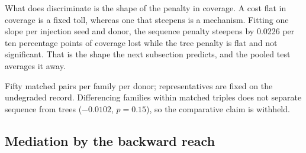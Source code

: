 \documentclass[conference]{IEEEtran}
\newcommand{\tablenote}[1]{%
  \par\vspace{2pt}%
  \parbox{\wd\tablebox}{\footnotesize #1\par}}
\begin{document}
What does discriminate is the shape of the penalty in coverage. A cost flat in coverage is a
fixed toll, whereas one that steepens is a mechanism. Fitting one slope per injection seed and
donor, the sequence penalty steepens by 0.0226 per ten percentage points of coverage lost
while the tree penalty is flat and not significant. That is the shape the next subsection
predicts, and the pooled test averages it away.

\begin{table}[!t]
\caption{Effect of arrangement at constant data volume.}
\label{tab:arm}
\centering
\footnotesize
{}
\usebox{\tablebox}
\tablenote{Fifty matched pairs per family per donor; representatives are fixed on
the undegraded record. Differencing families within matched triples does not
separate sequence from trees ($-0.0102$, $p=0.15$), so the comparative claim is
withheld.}
\end{table}

\subsection{Mediation by the backward reach}
\end{document}
